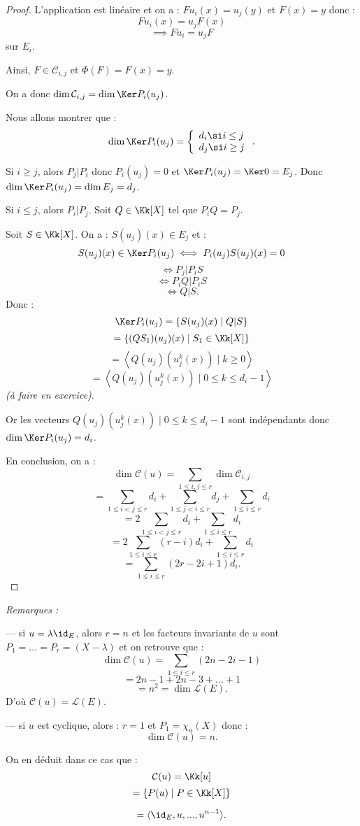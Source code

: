 \documentclass[class=report,crop=false]{standalone}
\newcommand{\exoo}{\emph{(à faire en exercice)}}
\begin{document}
\begin{proof}
L'application est linéaire et on a : $Fu_i(x) = u_j(y)$ et $F(x)=y$ donc :
\[Fu_i(x) = u_jF(x)\]
\[\implies Fu_i=u_jF\]
sur $E_i$.

Ainsi, $F \in \mathcal{C}_{i,j}$ et $\Phi(F)=F(x)=y$.

On a donc $\dim \mathcal{C}_{i,j}=\dim \Ker P_i(u_j)$.

Nous allons montrer que :
\[\dim \Ker P_i(u_j) =\left\{\begin{array}{l}
d_i \si i\le j\\
d_j \si i \ge j
\end{array}\right..\]

Si $i \ge j$, alors $P_j | P_i$ donc $P_i(u_j)=0$ et $\Ker P_i(u_j)= \Ker 0 =E_j$. Donc $\dim \Ker P_i(u_j) = \dim E_j = d_j$.

Si $i \le j$, alors $P_i|P_j$. Soit $Q \in \Kk[X]$ tel que $P_iQ=P_j$.

Soit $S\in \Kk[X]$. On a : $S(u_j)(x) \in E_j$ et :
\[S(u_j)(x) \in \Ker P_i(u_j) \iff P_i(u_j)S(u_j)(x)= 0\]
\[\iff P_j | P_iS\]
\[\iff P_i Q |P_iS\]
\[\iff Q |S .\]
Donc :
\[\Ker P_i(u_j) = \left\{S(u_j)(x) \mid Q |S\right\}\]
\[= \left\{ (QS_1)(u_j)(x)\mid S_1 \in\Kk[X]\right\}\]
\[= \left\langle Q(u_j)(u_j^k (x)) \mid k \ge 0\right\rangle\]
\[= \left\langle Q(u_j)(u_j^k (x)) \mid 0 \le k \le  d_i-1\right\rangle\]
\exoo .

Or les vecteurs $  Q(u_j)(u_j^k (x)) \mid 0 \le k \le  d_i-1$ sont indépendants donc $\dim \Ker P_i(u_j) = d_i$.

En conclusion, on a :
\[\dim \mathcal{C}(u) = \sum_{1 \le i , j\le r} \dim\mathcal{C}_{i,j} \]
\[= \sum_{1\le i < j \le r}d_i + \sum_{1 \le j < i \le r} d_j +\sum_{1\le i\le r} d_i\]
\[= 2 \sum_{1\le i < j \le r}d_i+\sum_{1\le i\le r} d_i\]
\[= 2\sum_{1 \le i \le r} (r-i) d_i +\sum_{1\le i\le r} d_i\]
\[= \sum_{1\le i\le r} (2r-2i+1)d_i.\]

\end{proof}

{\it Remarques :} 

--- si $u= \lambda\id_E$, alors $r=n$ et les facteurs invariants de $u$ sont $P_1=...=P_r=(X-\lambda)$ et on retrouve que :
\[\dim \mathcal{C}(u) = \sum_{1 \le i \le r }(2n-2i-1)\]
\[= 2n-1 + 2n -3 + ... + 1 \]
\[= n^2 = \dim \mathcal{L}(E).\]
D'où $\mathcal{C}(u) = \mathcal{L}(E)$.

--- si $u$ est cyclique, alors : $r=1$ et $P_1=\chi_u(X)$ donc :\[\dim \mathcal{C}(u) = n.\]
 
On en déduit dans ce cas que :
\[\mathcal{C}(u) = \Kk[u]\]
\[= \{P(u)\mid P \in \Kk[X]\}\]

\[= \langle \id_E,u,...,u^{n-1} \rangle.\]
\end{document}
